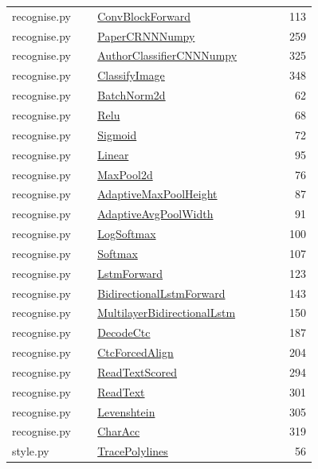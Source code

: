 \documentclass[11pt,a4paper,oneside]{report}
\begin{document}
\begin{longtable}{p{0.28\linewidth}p{0.48\linewidth}r}
recognise.py & \hyperref[fn:recognise:ConvBlockForward]{ConvBlockForward} & 113\\
recognise.py & \hyperref[fn:recognise:PaperCRNNNumpy]{PaperCRNNNumpy} & 259\\
recognise.py & \hyperref[fn:recognise:AuthorClassifierCNNNumpy]{AuthorClassifierCNNNumpy} & 325\\
recognise.py & \hyperref[fn:recognise:ClassifyImage]{ClassifyImage} & 348\\
recognise.py & \hyperref[fn:recognise:BatchNorm2d]{BatchNorm2d} & 62\\
recognise.py & \hyperref[fn:recognise:Relu]{Relu} & 68\\
recognise.py & \hyperref[fn:recognise:Sigmoid]{Sigmoid} & 72\\
recognise.py & \hyperref[fn:recognise:Linear]{Linear} & 95\\
recognise.py & \hyperref[fn:recognise:MaxPool2d]{MaxPool2d} & 76\\
recognise.py & \hyperref[fn:recognise:AdaptiveMaxPoolHeight]{AdaptiveMaxPoolHeight} & 87\\
recognise.py & \hyperref[fn:recognise:AdaptiveAvgPoolWidth]{AdaptiveAvgPoolWidth} & 91\\
recognise.py & \hyperref[fn:recognise:LogSoftmax]{LogSoftmax} & 100\\
recognise.py & \hyperref[fn:recognise:Softmax]{Softmax} & 107\\
recognise.py & \hyperref[fn:recognise:LstmForward]{LstmForward} & 123\\
recognise.py & \hyperref[fn:recognise:BidirectionalLstmForward]{BidirectionalLstmForward} & 143\\
recognise.py & \hyperref[fn:recognise:MultilayerBidirectionalLstm]{MultilayerBidirectionalLstm} & 150\\
recognise.py & \hyperref[fn:recognise:DecodeCtc]{DecodeCtc} & 187\\
recognise.py & \hyperref[fn:recognise:CtcForcedAlign]{CtcForcedAlign} & 204\\
recognise.py & \hyperref[fn:recognise:ReadTextScored]{ReadTextScored} & 294\\
recognise.py & \hyperref[fn:recognise:ReadText]{ReadText} & 301\\
recognise.py & \hyperref[fn:recognise:Levenshtein]{Levenshtein} & 305\\
recognise.py & \hyperref[fn:recognise:CharAcc]{CharAcc} & 319\\
style.py & \hyperref[fn:style:TracePolylines]{TracePolylines} & 56\\

\end{longtable}
\end{document}
